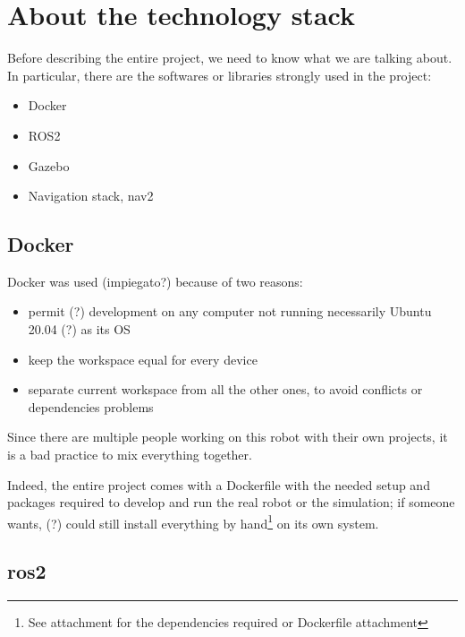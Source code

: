 \chapter{About the technology stack}
\label{cha:techstack}

Before describing the entire project, we need to know what we are talking about. In particular, there are the softwares or libraries strongly used in the project:  
\begin{itemize}
    \item Docker
    \item ROS2
    \item Gazebo
    \item Navigation stack, nav2
    \end{itemize}

\section{Docker}

Docker was used (impiegato?) because of two reasons:
\begin{itemize}
    \item permit (?) development on any computer not running necessarily Ubuntu 20.04 (?) as its OS
    \item keep the workspace equal for every device
    \item separate current workspace from all the other ones, to avoid conflicts or dependencies problems
\end{itemize}  

Since there are multiple people working on this robot with their own projects, it is a bad practice to mix everything together. %

Indeed, the entire project comes with a Dockerfile with the needed setup and packages required to develop and run the real robot or the simulation; if someone wants, (?) could still install everything by hand\footnote{See attachment for the dependencies required or Dockerfile attachment} on its own system.


\section{\acrshort{ros}2}


